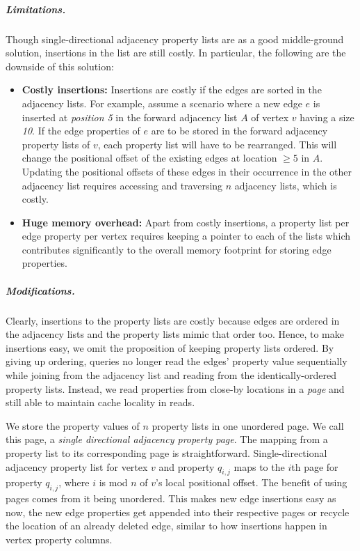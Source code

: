 \vspace{-12pt}
\subparagraph{Limitations.}Though single-directional adjacency property lists are as a good middle-ground solution, insertions in the list are still costly. In particular, the following are the downside of this solution:
\begin{itemize}
	\item \textbf{Costly insertions:} Insertions are costly if the edges are sorted in the adjacency lists. For example, assume a scenario where a new edge $e$ is inserted at \emph{position 5} in the forward adjacency list $A$ of vertex $v$ having a size \emph{10}. If the edge properties of $e$ are to be stored in the forward adjacency property lists of $v$, each property list will have to be rearranged. This will change the positional offset of the existing edges at location $\geq5$ in $A$. Updating the positional offsets of these edges in their occurrence in the other adjacency list requires accessing and traversing $n$ adjacency lists, which is costly.
	
	\item \textbf{Huge memory overhead:} Apart from costly insertions, a property list per edge property per vertex requires keeping a pointer to each of the lists which contributes significantly to the overall memory footprint for storing edge properties.
\end{itemize}

\vspace{-16pt}
\subparagraph{Modifications.}Clearly, insertions to the property lists are costly because edges are ordered in the adjacency lists and the property lists mimic that order too. Hence, to make insertions easy, we omit the proposition of keeping property lists ordered. By giving up ordering, queries no longer read the edges' property value sequentially while joining from the adjacency list and reading from the identically-ordered property lists. Instead, we read properties from close-by locations in a \emph{page} and still able to maintain cache locality in reads.

We store the property values of $n$ property lists in one unordered page. We call this page, a \emph{single directional adjacency property page}. The mapping from a property list to its corresponding page is straightforward. Single-directional adjacency property list for vertex $v$ and property $q_{i,j}$ maps to the $i$th page for property $q_{i,j}$, where $i$ is mod $n$ of $v$'s local positional offset. The benefit of using pages comes from it being unordered. This makes new edge insertions easy as now, the new edge properties get appended into their respective pages or recycle the location of an already deleted edge, similar to how insertions happen in vertex property columns. 

